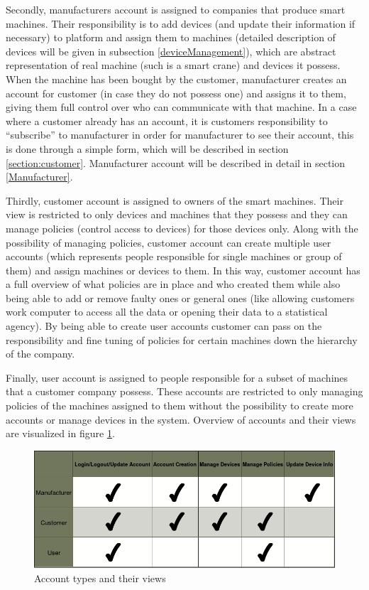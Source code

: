 Secondly, manufacturers account is assigned to companies that produce smart machines. Their responsibility is to add devices (and update their information if necessary) to platform and assign them to machines (detailed description of devices will be given in subsection \ref{deviceManagement}), which are abstract representation of real machine (such is a smart crane) and devices it possess. When the machine has been bought by the customer, manufacturer creates an account for customer (in case they do not possess one) and assigns it to them, giving them full control over who can communicate with that machine. In a case where a customer already has an account, it is customers responsibility to ``subscribe'' to manufacturer in order for manufacturer to see their account, this is done through a simple form, which will be described in section \ref{section:customer}. Manufacturer account will be described in detail in section \ref{Manufacturer}.

Thirdly, customer account is assigned to owners of the smart machines. Their view is restricted to only devices and machines that they possess and they can manage policies (control access to devices) for those devices only. Along with the possibility of managing policies, customer account can create multiple user accounts (which represents people responsible for single machines or group of them) and assign machines or devices to them. In this way, customer account has a full overview of what policies are in place and who created them while also being able to add or remove faulty ones or general ones (like allowing customers work computer to access all the data or opening their data to a statistical agency). By being able to create user accounts customer can pass on the responsibility and fine tuning of policies for certain machines down the hierarchy of the company.

Finally, user account is assigned to people responsible for a subset of machines that a customer company possess. These accounts are restricted to only managing policies of the machines assigned to them without the possibility to create more accounts or manage devices in the system. Overview of accounts and their views are visualized in figure \ref{fig:accountTypes}.

\begin{figure}[ht]
	\begin{center}
		\includegraphics[width=\textwidth]{images/Functionalities}
		\caption{Account types and their views}
		\label{fig:accountTypes}
	\end{center}
\end{figure}

